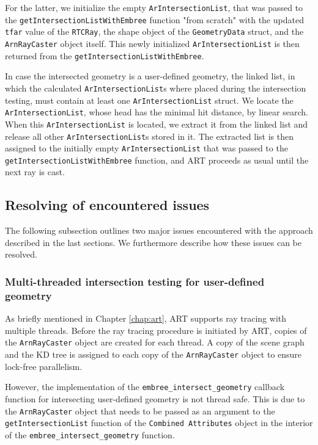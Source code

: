 For the latter, we initialize the empty \texttt{ArIntersectionList}, that was passed to the \texttt{getIntersectionListWithEmbree} function "from scratch" with the updated \texttt{tfar} value of the \texttt{RTCRay}, the shape object of the \texttt{GeometryData} struct, and the \texttt{ArnRayCaster} object itself. This newly initialized \texttt{ArIntersectionList} is then returned from the \texttt{getIntersectionListWithEmbree}.

In case the intersected geometry is a user-defined geometry, the linked list, in which the calculated \texttt{ArIntersectionList}s where placed during the intersection testing, must contain at least one \texttt{ArIntersectionList} struct. We locate the \texttt{ArIntersectionList}, whose head has the minimal hit distance, by linear search. When this \texttt{ArIntersectionList} is located, we extract it from the linked list and release all other \texttt{ArIntersectionList}s stored in it. The extracted list is then assigned to the initially empty \texttt{ArIntersectionList} that was passed to the \texttt{getIntersectionListWithEmbree} function, and ART proceeds as usual until the next ray is cast.


\subsection{Resolving of encountered issues}
\label{sec:issues_user}
The following subsection outlines two major issues encountered with the approach described in the last sections. We furthermore describe how these issues can be resolved.

\subsubsection{Multi-threaded intersection testing for user-defined geometry}
As briefly mentioned in Chapter \ref{chap:art}, ART supports ray tracing with multiple threads.
Before the ray tracing procedure is initiated by ART, copies of the \texttt{ArnRayCaster} object are created for each thread. A copy of the scene graph and the KD tree is assigned to each copy of the \texttt{ArnRayCaster} object to ensure lock-free parallelism.

However, the implementation of the \texttt{embree\_intersect\_geometry} callback function for intersecting user-defined geometry is not thread safe. This is due to the \texttt{ArnRayCaster} object that needs to be passed as an argument to the \texttt{getIntersectionList} function of the \texttt{Combined Attributes} object in the interior of the \texttt{embree\_intersect\_geometry} function.

